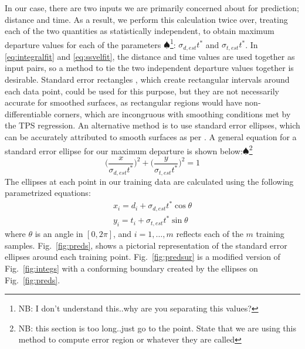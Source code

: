 \documentclass[letterpaper, 10 pt, conference]{ieeeconf}  %
\newcommand\NB[1]{$\spadesuit$\footnote{NB: #1}}
\begin{document}
In our case, there are two inputs we are primarily concerned about for prediction; distance and time. As a result, we perform this calculation twice over, treating each of the two quantities as statistically independent, to obtain maximum departure values for each of the parameters \NB{I don't understand this..why are you separating this values?}: $\sigma_{d,est}t^*$ and $\sigma_{t,est}t^*$. In \eqref{eq:integralfit} and \eqref{eq:ssvelfit}, the distance and time values are used together as input pairs, so a method to tie the two independent departure values together is desirable. Standard error rectangles \cite{stdellipse}, which create rectangular intervals around each data point, could be used for this purpose, but they are not necessarily accurate for smoothed surfaces, as rectangular regions would have non-differentiable corners, which are incongruous with smoothing conditions met by the TPS regression. An alternative method is to use standard error ellipses, which can be accurately attributed to smooth surfaces as per \cite{stdellipse}. A general equation for a standard error ellipse for our maximum departure is shown below:\NB{this section is too long..just go to the point. State that we are using this method to compute error region or whatever they are called}
\begin{equation}
    \bigg(\frac{x}{\sigma_{d,est}t^*}\bigg)^2 + \bigg(\frac{y}{\sigma_{t,est}t^*}\bigg)^2 = 1
\end{equation}
The ellipses at each point in our training data are calculated using the following parametrized equations:
\begin{align} \label{eq:bounds}
    x_i = d_i + \sigma_{d,est}t^*\cos{\theta} \nonumber \\
    y_i = t_i + \sigma_{t,est}t^*\sin{\theta} 
\end{align}
where $\theta$ is an angle in $[0,2\pi]$, and $i = 1,\ldots,m$ reflects each of the $m$ training samples. Fig.~\ref{fig:preds}, shows a pictorial representation of the standard error ellipses around each training point. Fig.~\ref{fig:predsur} is a modified version of Fig.~\ref{fig:integs} with a conforming boundary \cite{bounds} created by the ellipses on Fig.~\ref{fig:preds}.
\end{document}
